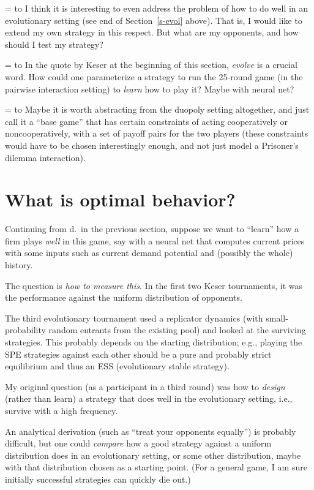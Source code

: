 \documentclass[a4paper,12pt]{article}  %
\def\rmitem#1{\par\hangafter=1\hangindent=\einr
  \noindent\hbox to\einr{\ignorespaces#1\hfill}\ignorespaces}
\theoremstyle{definition}
\begin{document}
\rmitem{c.}
I think it is interesting to even address the problem of how
to do well in an evolutionary setting (see end of
Section~\ref{s-evol} above).
That is, I would like to extend my own strategy in this
respect. But what are my opponents, and how should I
test my strategy?

\rmitem{d.}
In the quote by Keser at the beginning of this
section, \textit{evolve} is a crucial word.
How could one parameterize a strategy to run the 25-round
game (in the pairwise interaction setting) to
\textit{learn} how to play it? Maybe with neural net?
\rmitem{e.}
Maybe it is worth abstracting from the duopoly setting
altogether, and just call it a ``base game'' that has
certain constraints of acting cooperatively or
noncooperatively, with a set of payoff pairs for the two
players (these constraints would have to be chosen
interestingly enough, and not just model a Prisoner's
dilemma interaction). 

\section{What is optimal behavior?}
\label{s-opt}

Continuing from d.\ in the previous section,
suppose we want to ``learn'' how a firm plays \textit{well}
in this game, say with a neural net that computes current
prices with some inputs such as current demand potential and
(possibly the whole) history.

The question is \textit{how to measure this}.
In the first two Keser tournaments, it was the performance
against the uniform distribution of opponents.

The third evolutionary tournament used a replicator dynamics
(with small-probability random entrants from the existing
pool) and looked at the surviving strategies. 
This probably depends on the starting distribution; e.g.,
playing the SPE strategies against each other should be a 
pure and probably strict equilibrium and thus an ESS
(evolutionary stable strategy).

My original question (as a participant in a third round) was
how to \textit{design} (rather than learn) a strategy that
does well in the evolutionary setting, i.e., survive with a
high frequency.

An analytical derivation (such as ``treat your opponents
equally'') is probably difficult, but one could
\textit{compare} how a good strategy against a uniform
distribution does in an evolutionary setting, or some other
distribution, maybe with that distribution chosen as a
starting point.
(For a general game, I am sure initially successful
strategies can quickly die out.)
\end{document}
